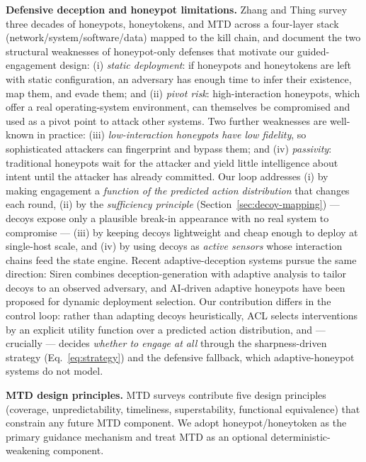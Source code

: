 \documentclass[preprints,article,accept,oneauthor]{Definitions/mdpi}
\begin{document}
\textbf{Defensive deception and honeypot limitations.} Zhang and Thing
\citep{zhang-thing} survey three decades of honeypots, honeytokens, and MTD
across a four-layer stack (network/system/software/data) mapped to the kill
chain, and document the two structural weaknesses of honeypot-only defenses
that motivate our guided-engagement design: (i) \textit{static deployment}:
if honeypots and honeytokens are left with static configuration, an
adversary has enough time to infer their existence, map them, and evade
them; and (ii) \textit{pivot risk}: high-interaction honeypots, which offer
a real operating-system environment, can themselves be compromised and used
as a pivot point to attack other systems. Two further weaknesses are
well-known in practice: (iii) \textit{low-interaction honeypots have low
fidelity}, so sophisticated attackers can fingerprint and bypass them; and
(iv) \textit{passivity}: traditional honeypots wait for the attacker and
yield little intelligence about intent until the attacker has already
committed. Our loop addresses (i) by making engagement a \textit{function of
the predicted action distribution} that changes each round, (ii) by the
\textit{sufficiency principle} (Section~\ref{sec:decoy-mapping}) --- decoys expose
only a plausible break-in appearance with no real system to compromise ---
(iii) by keeping decoys lightweight and cheap enough to deploy at
single-host scale, and (iv) by using decoys as \textit{active sensors} whose
interaction chains feed the state engine. Recent adaptive-deception systems
pursue the same direction: Siren \citep{siren-deception} combines
deception-generation with adaptive analysis to tailor decoys to an observed
adversary, and AI-driven adaptive honeypots have been proposed for dynamic
deployment selection. Our contribution differs in the control loop: rather
than adapting decoys heuristically, ACL selects interventions by an explicit
utility function over a predicted action distribution, and --- crucially ---
decides \textit{whether to engage at all} through the sharpness-driven
strategy (Eq.~\ref{eq:strategy}) and the defensive fallback, which
adaptive-honeypot systems do not model.

\textbf{MTD design principles.} MTD surveys \citep{mtd-survey} contribute
five design principles (coverage, unpredictability, timeliness,
superstability, functional equivalence) that constrain any future MTD
component. We adopt honeypot/honeytoken as the primary guidance mechanism
and treat MTD as an optional deterministic-weakening component.
\end{document}
